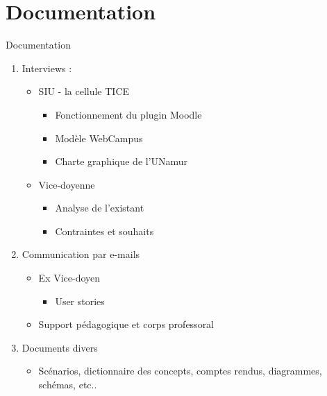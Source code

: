 \documentclass[numbering=fraction,10pt]{beamer}
\begin{document}
\section{Documentation}
\begin{frame}{Documentation}
    \begin{enumerate}
        \item Interviews :
        \begin{itemize}
            \item SIU - la cellule TICE
                \begin{itemize}
                    \item Fonctionnement du plugin Moodle
                    \item Modèle WebCampus
                    \item Charte graphique de l'UNamur
                \end{itemize}
            \item Vice-doyenne
                \begin{itemize}
                    \item Analyse de l'existant
                    \item Contraintes et souhaits
                \end{itemize}
        \end{itemize}
        \item Communication par e-mails
        \begin{itemize}
                \item Ex Vice-doyen
                    \begin{itemize}
                        \item User stories
                    \end{itemize}
                \item Support pédagogique et corps professoral 
        \end{itemize}
        \item Documents divers 
         \begin{itemize}
                \item Scénarios, dictionnaire des concepts, comptes rendus, diagrammes, schémas, etc..
         \end{itemize}
    \end{enumerate}
\end{frame}
\end{document}
